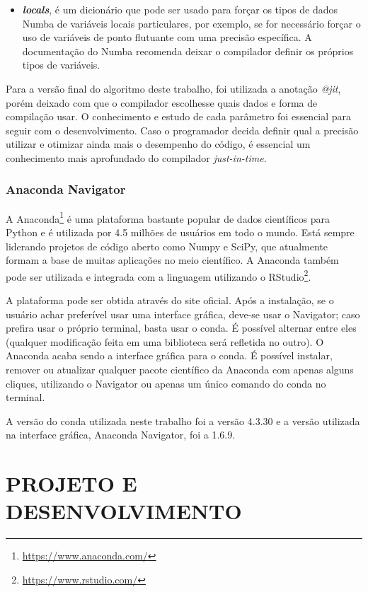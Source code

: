 \documentclass[
	12pt,				%
	openright,			%
	twoside,			%
	a4paper,			%
	english,			%
	french,				%
	spanish,			%
	brazil				%
	]{abntex2}
\begin{document}
\begin{itemize}
	\item \textbf{\textit{locals}}, é um dicionário que pode ser usado para forçar os tipos de dados Numba de variáveis locais particulares, por exemplo, se for necessário forçar o uso de variáveis de ponto flutuante com uma precisão específica. A documentação do Numba recomenda deixar o compilador  definir os próprios tipos de variáveis.
	
\end{itemize}

Para a versão final do algoritmo deste trabalho, foi utilizada a anotação \textit{@jit}, porém deixado com que o compilador escolhesse quais dados e forma de compilação usar. O conhecimento e estudo de cada parâmetro foi essencial para seguir com o desenvolvimento. Caso o programador decida definir qual a precisão utilizar e otimizar ainda mais o desempenho do código, é essencial um conhecimento mais aprofundado do compilador \textit{just-in-time}.


\subsection[Anaconda Navigator]{Anaconda Navigator}

A Anaconda\footnote{\url{https://www.anaconda.com/}} é uma plataforma bastante popular de dados científicos para Python e é utilizada por 4.5 milhões de usuários em todo o mundo. Está sempre liderando projetos de código aberto como Numpy e SciPy, que atualmente formam a base de muitas aplicações no meio científico. A Anaconda também pode ser utilizada e integrada com a linguagem utilizando o RStudio\footnote{\url{https://www.rstudio.com/}}.

A plataforma pode ser obtida através do site oficial. Após a instalação, se o usuário achar preferível usar uma interface gráfica, deve-se usar o Navigator; caso prefira usar o próprio terminal, basta usar o conda. É possível alternar entre eles (qualquer modificação feita em uma biblioteca será refletida no outro). O Anaconda acaba sendo a interface gráfica para o conda. É possível instalar, remover ou atualizar qualquer pacote científico da Anaconda com apenas alguns cliques, utilizando o Navigator ou apenas um único comando do conda no terminal.

A versão do conda utilizada neste trabalho foi a versão 4.3.30 e a versão utilizada na
interface gráfica, Anaconda Navigator, foi a 1.6.9.


\chapter[PROJETO E DESENVOLVIMENTO]{PROJETO E DESENVOLVIMENTO}
\end{document}
